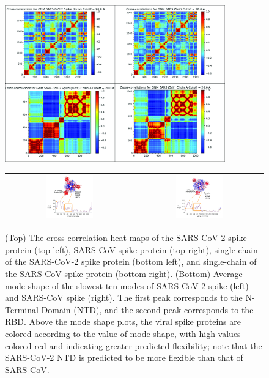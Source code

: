 \begin{figure}[p]
	\centering
	\mySfFamily
	\includegraphics[width = 0.85\textwidth]{../images_CMYK/CrossCorr}\\[2ex]
	\begin{tabular}{c c}
	\includegraphics[width = 0.38\textwidth]{../images_CMYK/spike_slowmode_SARS-CoV-2_edited} & \includegraphics[width = 0.38\textwidth]{../images_CMYK/spike_slowmode_SARS-CoV_edited}
	\end{tabular}
	\caption{(Top) The cross-correlation heat maps of the SARS-CoV-2 spike protein (top-left), SARS-CoV spike protein (top right), single chain of the SARS-CoV-2 spike protein (bottom left), and single-chain of the SARS-CoV spike protein (bottom right). (Bottom) Average mode shape of the slowest ten modes of SARS-CoV-2 spike (left) and SARS-CoV spike (right). The first peak corresponds to the N-Terminal Domain (NTD), and the second peak corresponds to the RBD. Above the mode shape plots, the viral spike proteins are colored according to the value of mode shape, with high values colored red and indicating greater predicted flexibility; note that the SARS-CoV-2 NTD is predicted to be more flexible than that of SARS-CoV.}
	\label{fig:spike_crosscorr_slowmode}
\end{figure}

